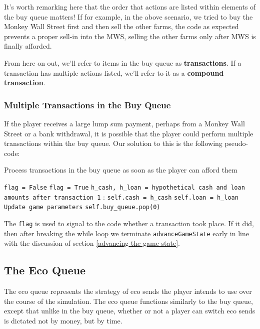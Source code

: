\documentclass[12pt,letterpaper]{article}
\theoremstyle{remark}
\theoremstyle{plain}
\begin{document}
It's worth remarking here that the order that actions are listed within elements of the buy queue matters! If for example, in the above scenario, we tried to buy the Monkey Wall Street first and then sell the other farms, the code as expected prevents a proper sell-in into the MWS, selling the other farms only after MWS is finally afforded.

From here on out, we'll refer to items in the buy queue as \textbf{transactions}. If a transaction has multiple actions listed, we'll refer to it as a \textbf{compound transaction}.

\subsubsection{Multiple Transactions in the Buy Queue}

If the player receives a large lump sum payment, perhaps from a Monkey Wall Street or a bank withdrawal, it is possible that the player could perform multiple transactions within the buy queue. Our solution to this is the following pseudo-code:

\begin{algorithm}
\caption{Process transactions in the buy queue as soon as the player can afford them}
\begin{algorithmic}
\State\texttt{flag = False}
	\State\texttt{flag = True}
    \State \texttt{h\_cash, h\_loan = hypothetical cash and loan amounts after transaction 1}
    :
    	\State\texttt{self.cash = h\_cash}
    	\State\texttt{self.loan = h\_loan}
    	\State\texttt{Update game parameters}
    	\State \texttt{self.buy\_queue.pop(0)}
   	\Else
   	\EndIf
\EndWhile
\end{algorithmic}
\end{algorithm}

The \texttt{flag} is used to signal to the code whether a transaction took place. If it did, then after breaking the while loop we terminate \texttt{advanceGameState} early in line with the discussion of section \ref{advancing the game state}.

\subsection{The Eco Queue}

The eco queue represents the strategy of eco sends the player intends to use over the course of the simulation. The eco queue functions similarly to the buy queue, except that unlike in the buy queue, whether or not a player can switch eco sends is dictated not by money, but by time.
\end{document}
